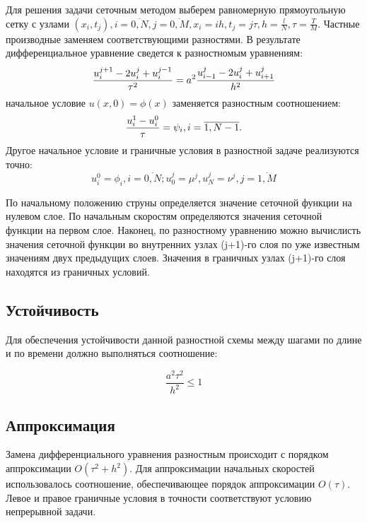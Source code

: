 \documentclass[titlepage,12pt]{article}
\begin{document}
Для решения задачи сеточным методом выберем равномерную прямоугольную сетку с узлами $(x_i,t_j), i=\overline{0,N}, j=\overline{0,M}, x_i=ih, t_j=j\tau, h=\frac{l}N, \tau=\frac{T}M $. Частные производные заменяем соответствующими разностями. В результате дифференциальное уравнение сведется к разностномым уравнениям:
\begin{equation}
\frac{u^{j+1}_i - 2 u^j_i + u^{j-1}_i}{\tau^2} = a^2 \frac{u^j_{i-1} - 2u^j_i + u^j_{i+1}}{h^2}\\
\end{equation}
начальное условие $u(x, 0) = \phi(x) $ заменяется разностным соотношением:
\begin{equation}
\frac{u_i^1-u_i^0}{\tau}=\psi_i, i=\overline{1,N-1}.\\
\end{equation}
Другое начальное условие и граничные условия в разностной задаче реализуются точно:
\begin{equation}
u_i^0=\phi_i, i=\overline{0,N}; u_0^j=\mu^j, u_N^j=\nu^j, j=\overline{1,M}
\end{equation}

По начальному положению струны определяется значение сеточной функции на нулевом слое. По начальным скоростям определяются значения сеточной функции на первом слое. Наконец, по разностному уравнению можно вычислисть значения сеточной функции во внутренних узлах (j+1)-го слоя по уже известным значениям двух предыдущих слоев. Значения в граничных узлах (j+1)-го слоя находятся из граничных условий.

\subsection{Устойчивость}

Для обеспечения устойчивости данной разностной схемы между шагами по длине и по времени должно выполняться соотношение:

\begin{equation}
\frac{a^2 \tau^2}{h^2} \leq 1
\end{equation}

\subsection{Аппроксимация}
Замена дифференциального уравнения разностным происходит с порядком аппроксимации $O(\tau^2 + h^2)$. Для аппроксимации начальных скоростей использовалось соотношение, обеспечивающее порядок аппроксимации $O(\tau)$. Левое и правое граничные условия в точности соответствуют условию непрерывной задачи.
\end{document}
